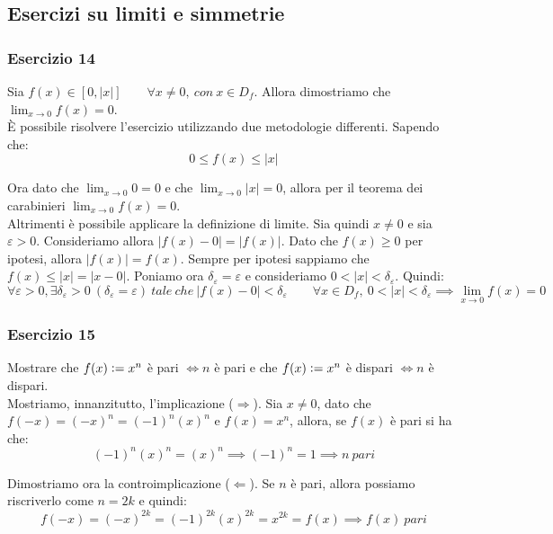 \documentclass{article}
\begin{document}
\subsection{Esercizi su limiti e simmetrie}
\subsubsection{Esercizio 14}
Sia $f(x) \in [0, |x|] \qquad \forall x \neq 0, \ con \ x \in D_f$. Allora dimostriamo che $\lim_{x \to 0} f(x) = 0$.\\
È possibile risolvere l'esercizio utilizzando due metodologie differenti. Sapendo che:
\begin{equation*}
    0 \leq f(x) \leq |x|
\end{equation*}

\noindent Ora dato che $\lim_{x \to 0} 0 = 0$ e che $\lim_{x \to 0} |x| = 0$, allora per il teorema dei carabinieri $\lim_{x \to 0} f(x) = 0$.\\
Altrimenti è possibile applicare la definizione di limite. Sia quindi $x \neq 0$ e sia $\varepsilon > 0$. Consideriamo allora $|f(x) - 0| = |f(x)|$. Dato che $f(x) \geq 0$ per ipotesi, allora $|f(x)| = f(x)$. Sempre per ipotesi sappiamo che $f(x) \leq |x| = |x - 0|$. Poniamo ora $\delta_\varepsilon = \varepsilon$ e consideriamo $0 < |x| < \delta_\varepsilon$. Quindi:
\begin{equation*}
    \forall \varepsilon > 0, \exists \delta_\varepsilon > 0 \ (\delta_\varepsilon = \varepsilon) \ tale \ che \ |f(x) - 0| < \delta_\varepsilon \qquad \forall x \in D_f, \ 0 < |x| < \delta_\varepsilon \implies \lim_{x \to 0} f(x) = 0
\end{equation*}

\subsubsection{Esercizio 15}
Mostrare che $f(x) \vcentcolon = x^n$ è pari $\iff n$ è pari e che $f(x) \vcentcolon = x^n$ è dispari $\iff n$ è dispari. \\

\noindent Mostriamo, innanzitutto, l'implicazione ($\Rightarrow$). Sia $x \neq 0$, dato che $f(-x) = (-x)^n = (-1)^n (x)^n$ e $f(x) = x^n$, allora, se $f(x)$ è pari si ha che:
\begin{equation*}
    (-1)^n (x)^n = (x)^n \implies (-1)^n = 1 \implies n \ pari
\end{equation*}

\noindent Dimostriamo ora la controimplicazione ($\Leftarrow$). Se $n$ è pari, allora possiamo riscriverlo come $n = 2k$ e quindi:
\begin{equation*}
    f(-x) = (-x)^{2k} = (-1)^{2k} (x)^{2k} = x^{2k} = f(x) \implies f(x) \ pari
\end{equation*}
\end{document}
